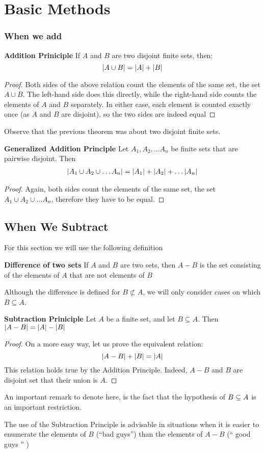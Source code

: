 \chapter{Basic Methods}
\subsection{When we add}
\begin{thm}
	\textbf{Addition Priniciple} If $A$ and $B$ are two disjoint finite sets, then:
	\[ \left|  A \cup B \right| = \left| A \right| + \left| B \right| \]
\end{thm}
\begin{proof}
	Both sides of the above relation count the elements of the same set, the set $ A \cup B$. The left-hand side does this directly, while the right-hand side counts the elements of $A$ and $B$ separately. In either case, each element is counted exactly once (as $A$ and $B$ are disjoint), so the two sides are indeed equal
\end{proof}
Observe that the previous theorem was about two disjoint finite sets.
\begin{thm}
	\textbf{Generalized Addition Principle} Let $ A_1, A_2, \ldots A_n$ be finite sets that are pairwise disjoint. Then
	\begin{align*}
	\left| A_1 \cup A_2 \cup \ldots A_n \right| = \left| A_1 \right| + \left| A_2 \right| + \ldots \left| A_n \right|
	\end{align*}
\end{thm}
\begin{proof}
	Again, both sides count the elements of the same set, the set $ A_1 \cup A_2 \cup \ldots A_n $, therefore they have to be equal.
\end{proof}
\section{When We Subtract}
For this section we will use the following definition
\begin{define}
	\textbf{Difference of two sets} If $A$ and $B$ are two sets, then $A - B$ is the set consisting of the elements of $A$ that are not elements of $B$
\end{define}
Although the difference is defined for $B \not \subset A$, we will only consider cases on which $ B \subseteq A$.
\begin{thm}
	\textbf{Subtraction Priniciple} Let $A$ be a finite set, and let $ B \subseteq A$. Then $ \left|  A - B \right| = \left| A \right| - \left| B \right|$
\end{thm}
\begin{proof}
	On a more easy way, let us prove the equivalent relation:
	\[ \left| A - B \right| + \left| B \right| = \left| A \right| \]
	This relation holds true by the Addition Principle. Indeed, $A - B$ and $B$ are disjoint set that their union is $A$.
\end{proof}
An important remark to denote here, is the fact that the hypothesis of $ B \subseteq A $ is an important restriction.

The use of the Subtraction Principle is advisable in situations when it is easier to enumerate the elements of $B$ (``bad guys'') than the elements of $ A - B $ (`` good guys '' )

